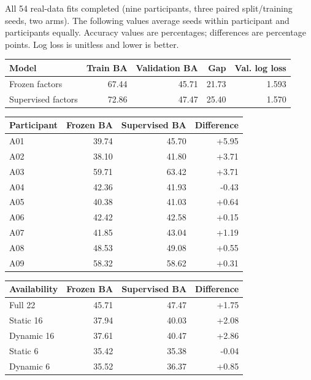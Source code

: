 All 54 real-data fits completed (nine participants, three paired split/training
seeds, two arms). The following values average seeds within participant and
participants equally. Accuracy values are percentages; differences are percentage
points. Log loss is unitless and lower is better.

\begin{center}\begin{tabular}{@{}lrrrr@{}}\toprule
Model & Train BA & Validation BA & Gap & Val. log loss \\ \midrule
Frozen factors & 67.44 & 45.71 & 21.73 & 1.593 \\
Supervised factors & 72.86 & 47.47 & 25.40 & 1.570 \\
\bottomrule\end{tabular}\end{center}

\begin{center}\begin{tabular}{@{}lrrr@{}}\toprule
Participant & Frozen BA & Supervised BA & Difference \\ \midrule
A01 & 39.74 & 45.70 & +5.95 \\
A02 & 38.10 & 41.80 & +3.71 \\
A03 & 59.71 & 63.42 & +3.71 \\
A04 & 42.36 & 41.93 & -0.43 \\
A05 & 40.38 & 41.03 & +0.64 \\
A06 & 42.42 & 42.58 & +0.15 \\
A07 & 41.85 & 43.04 & +1.19 \\
A08 & 48.53 & 49.08 & +0.55 \\
A09 & 58.32 & 58.62 & +0.31 \\
\bottomrule\end{tabular}\end{center}

\begin{center}\begin{tabular}{@{}lrrr@{}}\toprule
Availability & Frozen BA & Supervised BA & Difference \\ \midrule
Full 22 & 45.71 & 47.47 & +1.75 \\
Static 16 & 37.94 & 40.03 & +2.08 \\
Dynamic 16 & 37.61 & 40.47 & +2.86 \\
Static 6 & 35.42 & 35.38 & -0.04 \\
Dynamic 6 & 35.52 & 36.37 & +0.85 \\
\bottomrule\end{tabular}\end{center}

